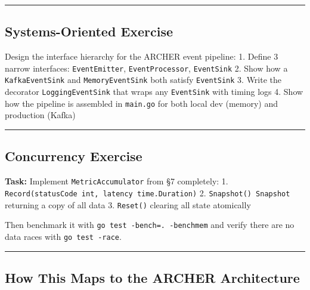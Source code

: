\documentclass[11pt,openany]{book}
\begin{document}
\begin{center}\rule{0.5\linewidth}{0.5pt}\end{center}

\hypertarget{systems-oriented-exercise-2}{%
\subsection{Systems-Oriented
Exercise}\label{systems-oriented-exercise-2}}

Design the interface hierarchy for the ARCHER event pipeline: 1. Define
3 narrow interfaces: \texttt{EventEmitter}, \texttt{EventProcessor},
\texttt{EventSink} 2. Show how a \texttt{KafkaEventSink} and
\texttt{MemoryEventSink} both satisfy \texttt{EventSink} 3. Write the
decorator \texttt{LoggingEventSink} that wraps any \texttt{EventSink}
with timing logs 4. Show how the pipeline is assembled in
\texttt{main.go} for both local dev (memory) and production (Kafka)

\begin{center}\rule{0.5\linewidth}{0.5pt}\end{center}

\hypertarget{concurrency-exercise}{%
\subsection{Concurrency Exercise}\label{concurrency-exercise}}

\textbf{Task:} Implement \texttt{MetricAccumulator} from §7 completely:
1. \texttt{Record(statusCode\ int,\ latency\ time.Duration)} 2.
\texttt{Snapshot()\ Snapshot} returning a copy of all data 3.
\texttt{Reset()} clearing all state atomically

Then benchmark it with \texttt{go\ test\ -bench=.\ -benchmem} and verify
there are no data races with \texttt{go\ test\ -race}.

\begin{center}\rule{0.5\linewidth}{0.5pt}\end{center}

\hypertarget{how-this-maps-to-the-archer-architecture-2}{%
\subsection{How This Maps to the ARCHER
Architecture}\label{how-this-maps-to-the-archer-architecture-2}}
\end{document}
